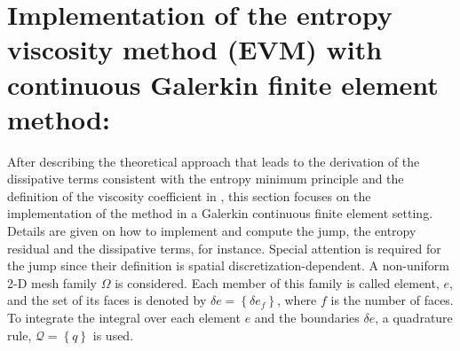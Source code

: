 \section{Implementation of the entropy viscosity method (EVM) with continuous Galerkin finite element method:}\label{sect:ev_impl_sect2}
After describing the theoretical approach that leads to the derivation of the dissipative terms consistent with the entropy minimum principle and the definition of the viscosity coefficient in , this section focuses on the implementation of the method in a Galerkin continuous finite element setting. Details are given on how to implement and compute the jump, the entropy residual and the dissipative terms, for instance. Special attention is required for the jump since their definition is spatial discretization-dependent. A non-uniform 2-D mesh family $\Omega$ is considered. Each member of this family is called element, $e$, and the set of its faces is denoted by $\delta e = \left\{ \delta e_f \right\}$, where $f$ is the number of faces. To integrate the integral over each element $e$ and the boundaries $\delta e$, a quadrature rule, $\mathcal{Q} = \left\{ q \right\}$ is used.

